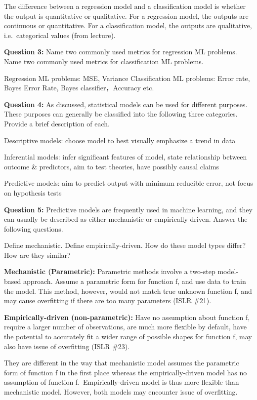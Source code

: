 \documentclass[
]{article}
\begin{document}
The difference between a regression model and a classification model is
whether the output is quantitative or qualitative. For a regression
model, the outputs are continuous or quantitative. For a classification
model, the outputs are qualitative, i.e.~categorical values (from
lecture).

\textbf{Question 3:} Name two commonly used metrics for regression ML
problems. Name two commonly used metrics for classification ML problems.

Regression ML problems: MSE, Variance Classification ML problems: Error
rate, Bayes Error Rate, Bayes classifier，Accuracy etc.

\textbf{Question 4:} As discussed, statistical models can be used for
different purposes. These purposes can generally be classified into the
following three categories. Provide a brief description of each.

Descriptive models: choose model to best visually emphasize a trend in
data

Inferential models: infer significant features of model, state
relationship between outcome \& predictors, aim to test theories, have
possibly causal claims

Predictive models: aim to predict output with minimum reducible error,
not focus on hypothesis tests

\textbf{Question 5:} Predictive models are frequently used in machine
learning, and they can usually be described as either mechanistic or
empirically-driven. Answer the following questions.

Define mechanistic. Define empirically-driven. How do these model types
differ? How are they similar?

\textbf{Mechanistic (Parametric):} Parametric methods involve a two-step
model-based approach. Assume a parametric form for function f, and use
data to train the model. This method, however, would not match true
unknown function f, and may cause overfitting if there are too many
parameters (ISLR \#21).

\textbf{Empirically-driven (non-parametric):} Have no assumption about
function f, require a larger number of observations, are much more
flexible by default, have the potential to accurately fit a wider range
of possible shapes for function f, may also have issue of overfitting
(ISLR \#23).

They are different in the way that mechanistic model assumes the
parametric form of function f in the first place whereas the
empirically-driven model has no assumption of function
f.~Empirically-driven model is thus more flexible than mechanistic
model. However, both models may encounter issue of overfitting.
\end{document}
